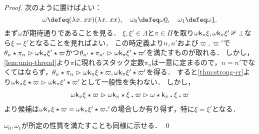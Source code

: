 \documentclass[realisability.tex]{subfiles}
\begin{document}
\begin{proof}
 次のように置けばよい：
 \[
  \omega \defeq (\abs{x}{xx})(\abs{x}{xx}), \quad
  \omega_0 \defeq \omega \num{0}, \quad
  \omega_1 \defeq \omega \num{1}.
 \]
 まず$\omega$が期待通りであることを見る．
 $\xi, \xi' \in \Lambda$と$\pi \in \Pi$を取り$\omega \mathsf{k}_\pi \xi, \omega \mathsf{k}_\pi \xi' \nVdash \bot$なら$\xi = \xi'$となることを見ればよい．
 この時定義より$n, n'$および$\varpi, \varpi'$で$\theta_n \mathbin{\star} \pi_n \mathrel{\rhd} \omega \mathsf{k}_\pi \xi' \mathbin{\star} \varpi$かつ$\theta_{n'} \mathbin{\star} \pi_{n'} \mathrel{\rhd} \omega \mathsf{k}_\pi \xi' \mathbin{\star} \varpi'$を満たすものが取れる．
 しかし，\cref{lem:uniq-thread}より$\pi$に現れるスタック定数$\pi_n$は一意に定まるので，$n = n'$でなくてはならず，$\theta_n \mathbin{\star} \pi_n \mathrel{\rhd} \omega \mathsf{k}_\pi \xi \mathbin{\star} \varpi, \omega \mathsf{k}_\pi \xi' \mathbin{\star} \varpi'$を得る．
 すると\cref{thm:strong-cr}より$\omega \mathsf{k}_\pi \xi \mathbin{\star} \varpi \mathrel{\rhd} \omega \mathsf{k}_\pi \xi' \mathbin{\star} \varpi'$として一般性を失わない．
 しかし，
 \begin{align*}
   \KVM{{{\omega \conti_\pi \xi}} \varpi}
  \reds
  \KVM{{{\omega \conti_\pi}} \xi \varpi}
  \reds
  \KVM{{{\omega}} {{\conti_\pi}} \xi \varpi}
 \end{align*} 
 より候補は$\KVM{{{\omega \conti_\pi \xi}}{\varpi}} = \KVM{{{\omega \conti_\pi \xi'}}{\varpi'}}$の場合しか有り得ず，特に$\xi = \xi'$となる．

 $\omega_0, \omega_1$が所定の性質を満たすことも同様に示せる． \qed
\end{proof}
\end{document}
